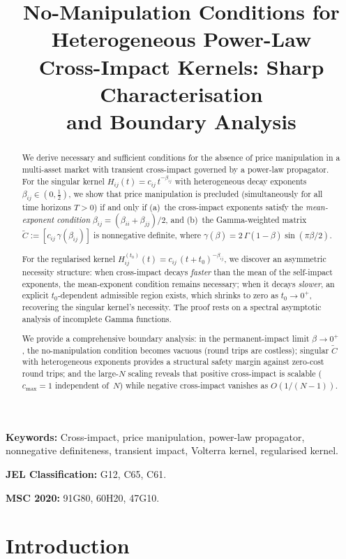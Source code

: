 \documentclass[12pt]{article}
\title{No-Manipulation Conditions for Heterogeneous Power-Law\\
Cross-Impact Kernels: Sharp Characterisation\\and Boundary Analysis}
\author{}
\date{}
\theoremstyle{definition}
\theoremstyle{remark}
\newcommand{\bC}{\widetilde{C}}
\begin{document}
\maketitle

\begin{abstract}
We derive necessary and sufficient conditions for the absence of price manipulation
in a multi-asset market with transient cross-impact governed by a power-law propagator.
For the singular kernel $H_{ij}(t) = c_{ij}\,t^{-\beta_{ij}}$ with heterogeneous
decay exponents $\beta_{ij}\in(0,\tfrac12)$, we show that price manipulation is
precluded (simultaneously for all time horizons $T>0$) if and only if
(a)~the cross-impact exponents satisfy the \emph{mean-exponent condition}
$\beta_{ij} = (\beta_{ii}+\beta_{jj})/2$, and
(b)~the Gamma-weighted matrix $\bC := [c_{ij}\,\gamma(\beta_{ij})]$ is nonnegative
definite, where $\gamma(\beta) = 2\,\Gamma(1-\beta)\sin(\pi\beta/2)$.

For the regularised kernel $H_{ij}^{(t_0)}(t) = c_{ij}\,(t+t_0)^{-\beta_{ij}}$,
we discover an asymmetric necessity structure: when cross-impact decays
\emph{faster} than the mean of the self-impact exponents, the mean-exponent
condition remains necessary; when it decays \emph{slower}, an explicit
$t_0$-dependent admissible region exists, which shrinks to zero as $t_0\to 0^+$,
recovering the singular kernel's necessity.  The proof rests on a spectral
asymptotic analysis of incomplete Gamma functions.

We provide a comprehensive boundary analysis: in the permanent-impact limit
$\beta\to 0^+$, the no-manipulation condition becomes vacuous (round trips
are costless); singular
$\bC$ with heterogeneous exponents provides a structural safety margin
against zero-cost round trips; and the large-$N$ scaling reveals that
positive cross-impact is scalable ($c_{\max}=1$ independent of~$N$) while
negative cross-impact vanishes as $O(1/(N{-}1))$.
\end{abstract}

\smallskip
\noindent\textbf{Keywords:} Cross-impact, price manipulation, power-law propagator,
nonnegative definiteness, transient impact, Volterra kernel, regularised kernel.

\noindent\textbf{JEL Classification:} G12, C65, C61.

\noindent\textbf{MSC 2020:} 91G80, 60H20, 47G10.


\section{Introduction}\label{sec:intro}
\end{document}
